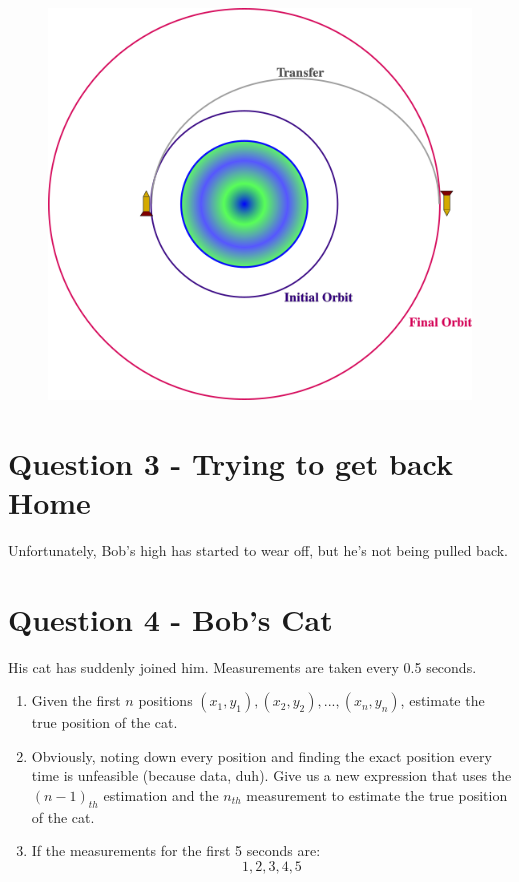 \documentclass[a4paper, 12pt]{exam}
\begin{document}
	\begin{figure}[h!]
		\centering
		\includegraphics[scale = 0.8]{Q2_Transfer_Image.png}
	\end{figure}
	
	\pagebreak
	
	\section*{Question 3 - Trying to get back Home}
	Unfortunately, Bob's high has started to wear off, but he's not being pulled back.
	
	\pagebreak
	\section*{Question 4 - Bob's Cat}
	His cat has suddenly joined him. Measurements are taken every 0.5 seconds.
	\begin{enumerate}[label = (\alph*)]
		\item Given the first $n$ positions ${(x_1, y_1), (x_2, y_2), ... , (x_n, y_n)}$, estimate the true position of the cat.
		\item Obviously, noting down every position and finding the exact position every time is unfeasible (because data, duh). Give us a new expression that uses the $(n-1)_{th}$ estimation and the $n_{th}$ measurement to estimate the true position of the cat.
		\item If the measurements for the first 5 seconds are:
		\begin{equation*}
			1,2,3,4,5
		\end{equation*}
	\end{enumerate}
	
	
\end{document}
